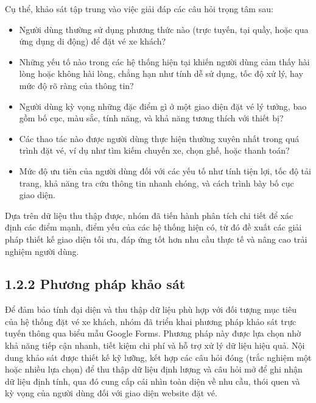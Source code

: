 Cụ thể, khảo sát tập trung vào việc giải đáp các câu hỏi trọng tâm sau: 
\begin{itemize}
    \item Người dùng thường sử dụng phương thức nào (trực tuyến, tại quầy, hoặc qua ứng dụng di động) để đặt vé xe khách?
    \item Những yếu tố nào trong các hệ thống hiện tại khiến người dùng cảm thấy hài lòng hoặc không hài lòng, chẳng hạn như tính dễ sử dụng, tốc độ xử lý, hay mức độ rõ ràng của thông tin?
    \item Người dùng kỳ vọng những đặc điểm gì ở một giao diện đặt vé lý tưởng, bao gồm bố cục, màu sắc, tính năng, và khả năng tương thích với thiết bị?
    \item Các thao tác nào được người dùng thực hiện thường xuyên nhất trong quá trình đặt vé, ví dụ như tìm kiếm chuyến xe, chọn ghế, hoặc thanh toán?
    \item Mức độ ưu tiên của người dùng đối với các yếu tố như tính tiện lợi, tốc độ tải trang, khả năng tra cứu thông tin nhanh chóng, và cách trình bày bố cục giao diện.
\end{itemize}


Dựa trên dữ liệu thu thập được, nhóm đã tiến hành phân tích chi tiết để xác định các điểm mạnh, điểm yếu của các hệ thống hiện có, từ đó đề xuất các giải pháp thiết kế giao diện tối ưu, đáp ứng tốt hơn nhu cầu thực tế và nâng cao trải nghiệm người dùng.

\subsection*{1.2.2 Phương pháp khảo sát}
Để đảm bảo tính đại diện và thu thập dữ liệu phù hợp với đối tượng mục tiêu của hệ thống đặt vé xe khách, nhóm đã triển khai phương pháp khảo sát trực tuyến thông qua biểu mẫu Google Forms. Phương pháp này được lựa chọn nhờ khả năng tiếp cận nhanh, tiết kiệm chi phí và hỗ trợ xử lý dữ liệu hiệu quả. Nội dung khảo sát được thiết kế kỹ lưỡng, kết hợp các câu hỏi đóng (trắc nghiệm một hoặc nhiều lựa chọn) để thu thập dữ liệu định lượng và câu hỏi mở để ghi nhận dữ liệu định tính, qua đó cung cấp cái nhìn toàn diện về nhu cầu, thói quen và kỳ vọng của người dùng đối với giao diện website đặt vé.


